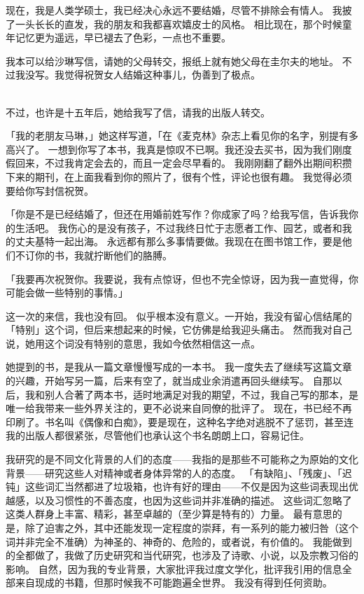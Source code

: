 \documentclass[UTF8]{ctexart}
\begin{document}
现在，我是人类学硕士，我已经决心永远不要结婚，尽管不排除会有情人。
我披了一头长长的直发，我的朋友和我都喜欢嬉皮士的风格。
相比现在，那个时候童年记忆更为遥远，早已褪去了色彩，一点也不重要。

我本可以给沙琳写信，请她的父母转交，报纸上就有她父母在圭尔夫的地址。
不过我没写。我觉得祝贺女人结婚这种事儿，伪善到了极点。

~\\

不过，也许是十五年后，她给我写了信，请我的出版人转交。

「我的老朋友马琳，」她这样写道，「在《麦克林》杂志上看见你的名字，别提有多高兴了。
一想到你写了本书，我真是惊叹不已啊。我还没去买书，因为我们刚度假回来，不过我肯定会去的，而且一定会尽早看的。
我刚刚翻了翻外出期间积攒下来的期刊，在上面我看到你的照片了，很有个性，评论也很有趣。
我觉得必须要给你写封信祝贺。

「你是不是已经结婚了，但还在用婚前姓写作？你成家了吗？给我写信，告诉我你的生活吧。
我伤心的是没有孩子，不过我终日忙于志愿者工作、园艺，或者和我的丈夫基特一起出海。
永远都有那么多事情要做。我现在在图书馆工作，要是他们不订你的书，我就拧断他们的胳膊。

「我要再次祝贺你。我要说，我有点惊讶，但也不完全惊讶，因为我一直觉得，你可能会做一些特别的事情。」

这一次的来信，我也没有回。
似乎根本没有意义。一开始，我没有留心信结尾的「特别」这个词，但后来想起来的时候，它仿佛是给我迎头痛击。
然而我对自己说，她用这个词没有特别的意思，我如今依然相信这一点。

她提到的书，是我从一篇文章慢慢写成的一本书。
我一度失去了继续写这篇文章的兴趣，开始写另一篇，后来有空了，就当成业余消遣再回头继续写。
自那以后，我和别人合著了两本书，适时地满足对我的期望，不过，我自己写的那本，是唯一给我带来一些外界关注的，更不必说来自同僚的批评了。
现在，书已经不再印刷了。书名叫《偶像和白痴》，要是现在，这种名字绝对逃脱不了惩罚，甚至连我的出版人都很紧张，尽管他们也承认这个书名朗朗上口，容易记住。

我研究的是不同文化背景的人们的态度——我指的是那些不可能称之为原始的文化背景——研究这些人对精神或者身体异常的人的态度。
「有缺陷」、「残废」、「迟钝」这些词汇当然都进了垃圾箱，也许有好的理由——不仅是因为这些词表现出优越感，以及习惯性的不善态度，也因为这些词并非准确的描述。
这些词汇忽略了这类人群身上丰富、精彩，甚至卓越的（至少算是特有的）力量。
最有意思的是，除了迫害之外，其中还能发现一定程度的崇拜，有一系列的能力被归咎（这个词并非完全不准确）为神圣的、神奇的、危险的，或者说，有价值的。
我能做到的全都做了，我做了历史研究和当代研究，也涉及了诗歌、小说，以及宗教习俗的影响。
自然，因为我的专业背景，大家批评我过度文学化，批评我引用的信息全部来自现成的书籍，但那时候我不可能跑遍全世界。
我没有得到任何资助。
\end{document}
